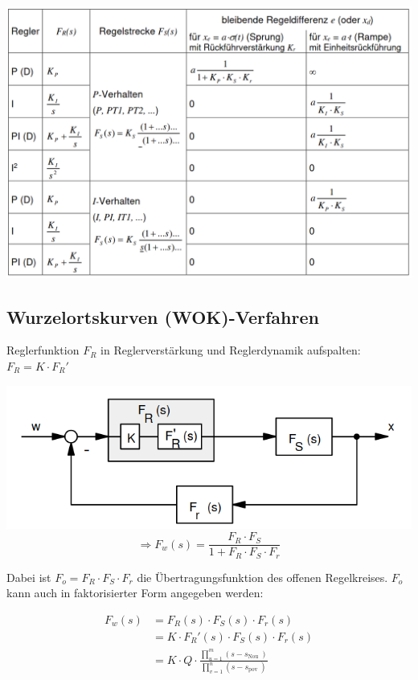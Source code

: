 \documentclass[10pt,a4paper]{article}
\begin{document}
\includegraphics[width=0.94\columnwidth]{Figures/Reglerauswahl.png}


\subsection{Wurzelortskurven (WOK)-Verfahren}
\begin{mdframed}[style=exercise]
	Reglerfunktion $F_R$ in Reglerverstärkung und Reglerdynamik aufspalten:
	$F_R =K \cdot F_R ' $
\end{mdframed}

\includegraphics[width=0.94\columnwidth]{Figures/WOKkreis.png}
\[
	\Rightarrow F_w (s)= \dfrac {F_R \cdot F_S} {1+F_R \cdot F_S \cdot F_r}
\]

\begin{mdframed}[style=exercise]
	Dabei ist $F_o = F_R \cdot F_S \cdot F_r$ die Übertragungsfunktion des
	offenen Regelkreises. $F_o$ kann auch in faktorisierter Form angegeben
	werden:
\end{mdframed}

\begin{align*}
	F_w (s) & = F_R (s) \cdot F_S (s) \cdot F_r (s)
	\\ & =K \cdot F_R '(s) \cdot F_S (s) \cdot F_r (s)
	\\ & =K \cdot Q \cdot \frac{\prod_{u=1}^{m}\left(s-s_{\text {Nou
			}}\right)}{\prod_{v=1}^{n}\left(s-s_{\text {pov }}\right)}
\end{align*}
\end{document}
